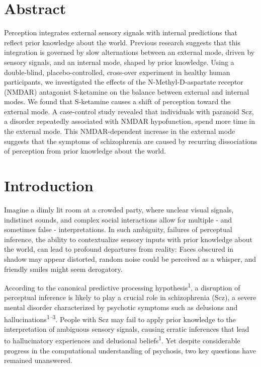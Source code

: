 \documentclass[
]{article}
\begin{document}
\newpage

\linenumbers

\section{Abstract}\label{abstract}

Perception integrates external sensory signals with internal predictions
that reflect prior knowledge about the world. Previous research suggests
that this integration is governed by slow alternations between an
external mode, driven by sensory signals, and an internal mode, shaped
by prior knowledge. Using a double-blind, placebo-controlled, cross-over
experiment in healthy human participants, we investigated the effects of
the N-Methyl-D-aspartate receptor (NMDAR) antagonist S-ketamine on the
balance between external and internal modes. We found that S-ketamine
causes a shift of perception toward the external mode. A case-control
study revealed that individuals with paranoid Scz, a disorder repeatedly
associated with NMDAR hypofunction, spend more time in the external
mode. This NMDAR-dependent increase in the external mode suggests that
the symptoms of schizophrenia are caused by recurring dissociations of
perception from prior knowledge about the world.

\section{Introduction}\label{introduction}

Imagine a dimly lit room at a crowded party, where unclear visual
signals, indistinct sounds, and complex social interactions allow for
multiple - and sometimes false - interpretations. In such ambiguity,
failures of perceptual inference, the ability to contextualize sensory
inputs with prior knowledge about the world, can lead to profound
departures from reality: Faces obscured in shadow may appear distorted,
random noise could be perceived as a whisper, and friendly smiles might
seem derogatory.

According to the canonical predictive processing
hypothesis\textsuperscript{1}, a disruption of perceptual inference is
likely to play a crucial role in schizophrenia (Scz), a severe mental
disorder characterized by psychotic symptoms such as delusions and
hallucinations\textsuperscript{1--3}. People with Scz may fail to apply
prior knowledge to the interpretation of ambiguous sensory signals,
causing erratic inferences that lead to hallucinatory experiences and
delusional beliefs\textsuperscript{1}. Yet despite considerable progress
in the computational understanding of psychosis, two key questions have
remained unanswered.
\end{document}
